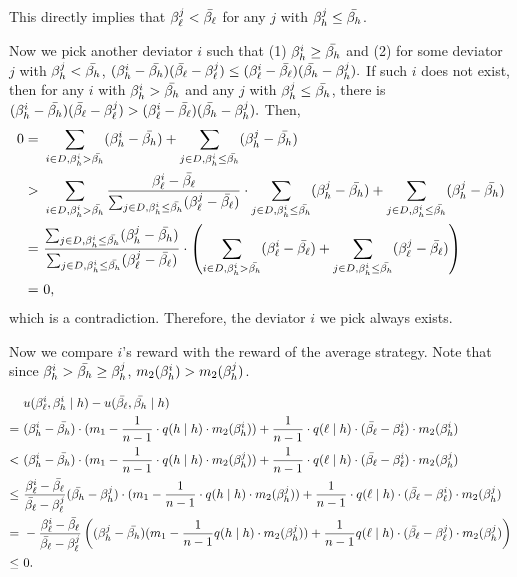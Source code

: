 This directly implies that $\beta_{\ell}^j < \bar{\beta_{\ell}}$ for any $j$ with $\beta_{h}^j \le \bar{\beta_{h}}$. 

Now we pick another deviator $i$ such that (1) $\beta_{h}^i \ge \bar{\beta_{h}}$ and (2) for some deviator $j$ with $\beta_{h}^j < \bar{\beta_{h}}$, $(\beta_{h}^i - \bar{\beta_{h}})(\bar{\beta_{\ell}} - \beta_{\ell}^j) \le (\beta_{\ell}^i - \bar{\beta_{\ell}})(\bar{\beta_{h}} - \beta_{h}^j).$ If such $i$ does not exist, then for any $i$ with $\beta_{h}^i > \bar{\beta_{h}}$ and any $j$ with $\beta_{h}^j \le \bar{\beta_{h}}$, there is $(\beta_{h}^i - \bar{\beta_{h}})(\bar{\beta_{\ell}} - \beta_{\ell}^j) > (\beta_{\ell}^i - \bar{\beta_{\ell}})(\bar{\beta_{h}} - \beta_{h}^j).$ Then, 
\begin{align*}
    0 = &\ \sum_{i\in D, \beta_{h}^i > \bar{\beta_{h}}} (\beta_{h}^i - \bar{\beta_{h}}) + \sum_{j\in D, \beta_{h}^i \le \bar{\beta_{h}}} (\beta_{h}^j - \bar{\beta_{h}})\\
    > &\ \sum_{i\in D, \beta_{h}^i > \bar{\beta_{h}}} \frac{\beta_{\ell}^i - \bar{\beta_{\ell}}}{\sum_{j\in D, \beta_{h}^i \le \bar{\beta_{h}}} (\beta_{\ell}^j - \bar{\beta_{\ell}})}\cdot\sum_{j\in D, \beta_{h}^i \le \bar{\beta_{h}}} (\beta_{h}^j - \bar{\beta_{h}}) + \sum_{j\in D, \beta_{h}^i \le \bar{\beta_{h}}} (\beta_{h}^j - \bar{\beta_{h}})\\
    = &\ \frac{\sum_{j\in D, \beta_{h}^i \le \bar{\beta_{h}}} (\beta_{h}^j - \bar{\beta_{h}})}{\sum_{j\in D, \beta_{h}^i \le \bar{\beta_{h}}} (\beta_{\ell}^j - \bar{\beta_{\ell}})} \cdot \left(\sum_{i\in D, \beta_{h}^i > \bar{\beta_{h}}}(\beta_{\ell}^i - \bar{\beta_{\ell}}) +  \sum_{j\in D, \beta_{h}^i \le \bar{\beta_{h}}} (\beta_{\ell}^j - \bar{\beta_{\ell}}) \right)\\
    =&\ 0,
\end{align*}
which is a contradiction. 
Therefore, the deviator $i$ we pick always exists. 

Now we compare $i$'s reward with the reward of the average strategy. Note that since $\beta_{h}^i > \bar{\beta_{h}} \ge \beta_{h}^j$, $m_2(\beta_{h}^i) > m_2(\beta_{h}^j)$. 

\begin{align*}
&\ u(\beta_{\ell}^i, \beta_{h}^i \mid h) - u(\bar{\beta_{\ell}}, \bar{\beta_{h}} \mid h)\\
    =&\ (\beta_{h}^i - \bar{\beta_{h}})\cdot(m_1 - \frac{1}{n - 1} \cdot q(h \mid h)\cdot m_2(\beta_{h}^i)) + \frac{1}{n - 1} \cdot q(\ell \mid h) \cdot (\bar{\beta_{\ell}} - \beta_{\ell}^i) \cdot m_2(\beta_{h}^i)\\
    < &\ (\beta_{h}^i - \bar{\beta_{h}})\cdot(m_1 - \frac{1}{n - 1} \cdot q(h \mid h)\cdot m_2(\beta_{h}^j)) + \frac{1}{n - 1} \cdot q(\ell \mid h) \cdot (\bar{\beta_{\ell}} - \beta_{\ell}^i) \cdot m_2(\beta_{h}^j)\\
    \le &\ \frac{\beta_{\ell}^i - \bar{\beta_{\ell}}}{\bar{\beta_{\ell}} - \beta_{\ell}^j} (\bar{\beta_{h}} - \beta_{h}^j) \cdot (m_1 - \frac{1}{n - 1} \cdot q(h \mid h)\cdot m_2(\beta_{h}^j)) + \frac{1}{n - 1} \cdot q(\ell \mid h) \cdot (\bar{\beta_{\ell}} - \beta_{\ell}^i) \cdot m_2(\beta_{h}^j)\\
    =&\ - \frac{\beta_{\ell}^i - \bar{\beta_{\ell}}}{\bar{\beta_{\ell}} - \beta_{\ell}^j} \left(  (\beta_{h}^j - \bar{\beta_{h}})(m_1 - \frac{1}{n - 1} q(h \mid h)\cdot m_2(\beta_{h}^j)) + \frac{1}{n - 1}  q(\ell \mid h) \cdot (\bar{\beta_{\ell}} - \beta_{\ell}^j) \cdot m_2(\beta_{h}^j)\right)\\
    \le &\ 0. 
\end{align*}

